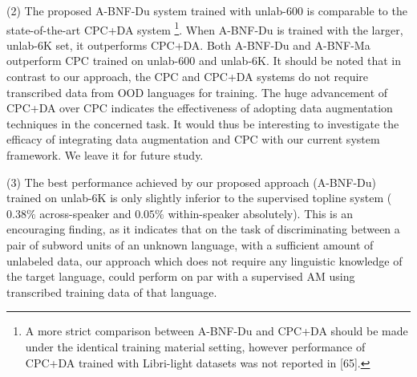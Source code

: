 \documentclass[transmag]{IEEEtran}
\begin{document}
(2) The proposed A-BNF-Du system trained with unlab-600 is comparable to the state-of-the-art CPC+DA system \cite{Kharitonov2020data_augment}\footnote{A more strict comparison between A-BNF-Du and CPC+DA should be made under the identical training material setting, however performance of CPC+DA trained with Libri-light datasets was not reported in [65].}. When A-BNF-Du is trained with the larger, unlab-6K set, it outperforms CPC+DA. Both A-BNF-Du and A-BNF-Ma outperform CPC  \cite{kahn2019librilight}
trained on   unlab-600 and unlab-6K.
It should be noted that in contrast to our approach, the CPC and CPC+DA systems do not require transcribed data from OOD languages for training. The huge advancement of CPC+DA  \cite{Kharitonov2020data_augment} over CPC \cite{kahn2019librilight} indicates the effectiveness of adopting data augmentation techniques in the concerned task. It would thus be interesting to investigate the efficacy of integrating data augmentation and CPC with our current system framework. We leave it for future study.  


(3) The best performance achieved by our proposed approach (A-BNF-Du) trained on unlab-6K is only slightly inferior to the supervised topline system ($0.38\%$ across-speaker and $0.05\%$ within-speaker absolutely).  This is an encouraging finding, as it indicates that on the task of discriminating between  a pair of subword units of an unknown language,
with a sufficient amount of unlabeled data,  our approach which does not  require any linguistic knowledge of the target language, could perform on par with a supervised AM using transcribed training data of that language.
\end{document}
